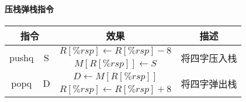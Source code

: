 \paragraph{压栈弹栈指令}
\begin{table}[H]
    \centering
    \begin{tabular}{|c c|c|c|}
        \hline
        \multicolumn{2}{|c|}{\textbf{指令}} & \textbf{效果} & \textbf{描述} \\
        \hline
        \multirow{2}{*}{pushq} & \multirow{2}{*}{S} & $R[\%rsp] \leftarrow R[\%rsp]-8$ &  \multirow{2}{*}{将四字压入栈} \\
        & & $M[R[\%rsp]] \leftarrow S$ & \\
        \hline
        \multirow{2}{*}{popq} & \multirow{2}{*}{D} & $D \leftarrow M[R[\%rsp]]$ &  \multirow{2}{*}{将四字弹出栈} \\
        & & $R[\%rsp] \leftarrow R[\%rsp]+8$ & \\
        \hline
    \end{tabular}
\end{table}

